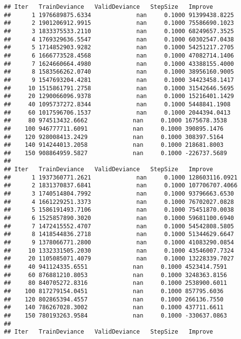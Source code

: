 \documentclass[
]{article}
\begin{document}
\begin{verbatim}
## Iter   TrainDeviance   ValidDeviance   StepSize   Improve
##      1 1976689875.6334             nan     0.1000 91399438.8225
##      2 1901206912.9915             nan     0.1000 75586690.1023
##      3 1833375533.2110             nan     0.1000 68249657.3525
##      4 1769329636.5547             nan     0.1000 60302547.0438
##      5 1714852903.9282             nan     0.1000 54251217.2705
##      6 1666773528.4568             nan     0.1000 47082714.1406
##      7 1624660664.4980             nan     0.1000 43388155.4000
##      8 1583566262.0740             nan     0.1000 38956160.9005
##      9 1547693204.4281             nan     0.1000 34423458.1417
##     10 1515861791.2758             nan     0.1000 31542646.5695
##     20 1290066096.9378             nan     0.1000 15216401.1429
##     40 1095737272.8344             nan     0.1000 5448841.1908
##     60 1017596706.1537             nan     0.1000 2044394.0413
##     80 974513432.6662             nan     0.1000 1675678.3538
##    100 946777711.6091             nan     0.1000 390895.1476
##    120 928008413.2429             nan     0.1000 308397.5164
##    140 914244013.2058             nan     0.1000 218681.8003
##    150 908864959.5827             nan     0.1000 -226737.5689
## 
## Iter   TrainDeviance   ValidDeviance   StepSize   Improve
##      1 1937360771.2621             nan     0.1000 128603116.0921
##      2 1831370837.6841             nan     0.1000 107706707.4066
##      3 1740514804.7992             nan     0.1000 93796663.6530
##      4 1661229251.3373             nan     0.1000 76702027.0828
##      5 1586191493.7106             nan     0.1000 75451870.0038
##      6 1525857890.3020             nan     0.1000 59681100.6940
##      7 1472415552.4707             nan     0.1000 54542808.5805
##      8 1418544836.2718             nan     0.1000 51344629.6647
##      9 1378066771.2800             nan     0.1000 41083290.0854
##     10 1332331505.2030             nan     0.1000 43546007.7324
##     20 1105085071.4079             nan     0.1000 13228339.7027
##     40 941124335.6551             nan     0.1000 4523414.7591
##     60 876881210.8053             nan     0.1000 3248363.8156
##     80 840705272.8316             nan     0.1000 2538900.6011
##    100 817279154.0451             nan     0.1000 857795.6036
##    120 802865394.4557             nan     0.1000 266136.7550
##    140 786267028.3002             nan     0.1000 437711.6611
##    150 780193263.9584             nan     0.1000 -330637.0863
## 
## Iter   TrainDeviance   ValidDeviance   StepSize   Improve

\end{verbatim}
\end{document}
